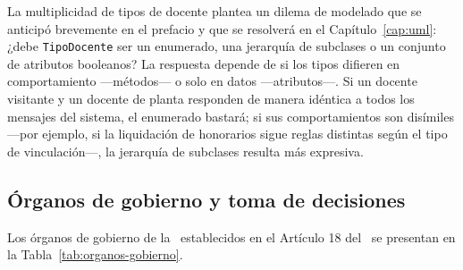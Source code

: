 La multiplicidad de tipos de docente plantea un dilema de modelado que se
anticipó brevemente en el prefacio y que se resolverá en el
Capítulo~\ref{cap:uml}: ¿debe \texttt{TipoDocente} ser un enumerado, una
jerarquía de subclases o un conjunto de atributos booleanos? La respuesta
depende de si los tipos difieren en comportamiento ---métodos--- o solo en
datos ---atributos---. Si un docente visitante y un docente de planta
responden de manera idéntica a todos los mensajes del sistema, el enumerado
bastará; si sus comportamientos son disímiles ---por ejemplo, si la liquidación
de honorarios sigue reglas distintas según el tipo de vinculación---,
la jerarquía de subclases resulta más expresiva.

\subsection{Órganos de gobierno y toma de decisiones}
\label{subsec:organos-gobierno}

Los órganos de gobierno de la \ud\ establecidos en el Artículo 18 del
\acuerdo\ se presentan en la Tabla~\ref{tab:organos-gobierno}.

